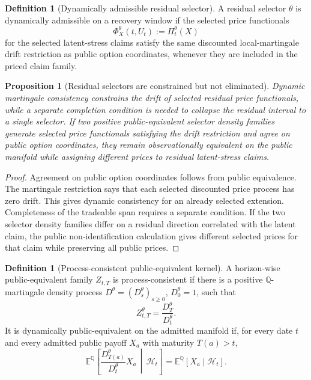 \documentclass[11pt,a4paper]{amsart}
\theoremstyle{plain}
\newtheorem{proposition}[theorem]{Proposition}
\theoremstyle{definition}
\newtheorem{definition}[theorem]{Definition}
\theoremstyle{remark}
\newcommand{\QQ}{\mathbb{Q}}
\newcommand{\EE}{\mathbb{E}}
\newcommand{\cH}{\mathcal{H}}
\begin{document}
\begin{definition}[Dynamically admissible residual selector]\label{def:dynamic-selector-admissible}
A residual selector \(\theta\) is dynamically admissible on a recovery window if the selected
price functionals
\[
        \Phi_X^\theta(t,U_t):=\Pi_t^\theta(X)
\]
for the selected latent-stress claims satisfy the same discounted local-martingale drift
restriction as public option coordinates, whenever they are included in the priced claim family.
\end{definition}

\begin{proposition}[Residual selectors are constrained but not eliminated]\label{prop:selector-not-eliminated}
Dynamic martingale consistency constrains the drift of selected residual price functionals, while a
separate completion condition is needed to collapse the residual interval to a single selector.  If two positive
public-equivalent selector density families generate selected price functionals satisfying the drift
restriction and agree on public option coordinates, they remain observationally equivalent on the
public manifold while assigning different prices to residual latent-stress claims.
\end{proposition}

\begin{proof}
Agreement on public option coordinates follows from public equivalence.  The martingale
restriction says that each selected discounted price process has zero drift.  This gives dynamic
consistency for an already selected extension.  Completeness of the tradeable span requires a
separate condition.  If the two selector density families differ on a residual direction correlated with the latent
claim, the public non-identification calculation gives different selected prices for that claim
while preserving all public prices.
\end{proof}

\begin{definition}[Process-consistent public-equivalent kernel]\label{def:process-consistent-kernel}
A horizon-wise public-equivalent family \(Z_{t,T}\) is process-consistent if there is a positive
\(\QQ\)-martingale density process \(D^\theta=(D_s^\theta)_{s\ge0}\), \(D_0^\theta=1\), such
that
\[
        Z_{t,T}^\theta=\frac{D_T^\theta}{D_t^\theta}.
\]
It is dynamically public-equivalent on the admitted manifold if, for every date \(t\) and every
admitted public payoff \(X_a\) with maturity \(T(a)>t\),
\[
        \EE^\QQ\!\left[
        \frac{D_{T(a)}^\theta}{D_t^\theta}X_a
        \,\middle|\,\cH_t
        \right]
        =
        \EE^\QQ[X_a\mid\cH_t].
\]
\end{definition}
\end{document}
